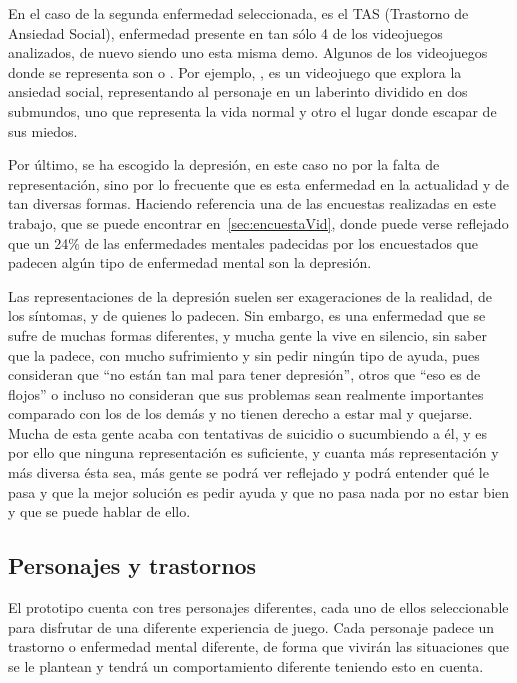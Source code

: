 \documentclass[12pt, a4paper,twoside,titlepage]{book}
\begin{document}
En el caso de la segunda enfermedad seleccionada, es el TAS (Trastorno de Ansiedad Social), enfermedad presente en tan sólo 4 de los videojuegos analizados, de nuevo siendo uno esta misma demo. Algunos de los videojuegos donde se representa son  o . Por ejemplo, , es un videojuego que explora la ansiedad social, representando al personaje en un laberinto dividido en dos submundos, uno que representa la vida normal y otro el lugar donde escapar de sus miedos. 

Por último, se ha escogido la depresión, en este caso no por la falta de representación, sino por lo frecuente que es esta enfermedad en la actualidad y de tan diversas formas. Haciendo referencia una de las encuestas realizadas en este trabajo, que se puede encontrar en~\ref{sec:encuestaVid}, donde puede verse reflejado que un 24\% de las enfermedades mentales padecidas por los encuestados que padecen algún tipo de enfermedad mental son la depresión.

Las representaciones de la depresión suelen ser exageraciones de la realidad, de los síntomas, y de quienes lo padecen. Sin embargo, es una enfermedad que se sufre de muchas formas diferentes, y mucha gente la vive en silencio, sin saber que la padece, con mucho sufrimiento y sin pedir ningún tipo de ayuda, pues consideran que ``no están tan mal para tener depresión'', otros que ``eso es de flojos'' o incluso no consideran que sus problemas sean realmente importantes comparado con los de los demás y no tienen derecho a estar mal y quejarse. Mucha de esta gente acaba con tentativas de suicidio o sucumbiendo a él, y es por ello que ninguna representación es suficiente, y cuanta más representación y más diversa ésta sea, más gente se podrá ver reflejado y podrá entender qué le pasa y que la mejor solución es pedir ayuda y que no pasa nada por no estar bien y que se puede hablar de ello. 




\subsection{Personajes y trastornos}


El prototipo cuenta con tres personajes diferentes, cada uno de ellos seleccionable para disfrutar de una diferente experiencia de juego. Cada personaje padece un trastorno o enfermedad mental diferente, de forma que vivirán las situaciones que se le plantean y tendrá un comportamiento diferente teniendo esto en cuenta.  
\end{document}
